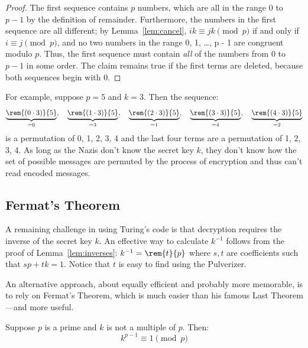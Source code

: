 \begin{proof}
The first sequence contains $p$ numbers, which are all in the range
$0$ to $p - 1$ by the definition of remainder.  Furthermore, the
numbers in the first sequence are all different; by
Lemma~\ref{lem:cancel}, $i k \equiv j k \pmod{p}$
if and only if $i \equiv j \pmod{p}$, and no two numbers in the range 0, 1,
\dots, p - 1 are congruent modulo $p$.  Thus, the first sequence must
contain \textit{all} of the numbers from 0 to $p - 1$ in some order.
The claim remains true if the first terms are deleted, because both
sequences begin with 0.
\end{proof}

For example, suppose $p = 5$ and $k = 3$.  Then the sequence:
%
\[
\underbrace{\rem{(0 \cdot 3)}{5}}_{=0},\quad
\underbrace{\rem{(1 \cdot 3)}{5}}_{=3},\quad
\underbrace{\rem{(2 \cdot 3)}{5}}_{=1},\quad
\underbrace{\rem{(3 \cdot 3)}{5}}_{=4},\quad
\underbrace{\rem{(4 \cdot 3)}{5}}_{=2}
\]
%
is a permutation of 0, 1, 2, 3, 4 and the last four terms are a
permutation of 1, 2, 3, 4.  As long as the Nazis don't know the secret key
$k$, they don't know how the set of possible messages are permuted by the
process of encryption and thus can't read encoded messages.


\subsection{Fermat's Theorem}

A remaining challenge in using Turing's code is that decryption requires
the inverse of the secret key $k$.  An effective way to calculate
$k^{-1}$ follows from the proof of Lemma~\ref{lem:inverses}: $k^{-1} =
\rem{t}{p}$ where $s,t$ are coefficients such that $sp+tk=1$.  Notice that
$t$ is easy to find using the Pulverizer.

An alternative approach, about equally efficient and probably more
memorable, is to rely on Fermat's Theorem, which is much easier than his
famous Last Theorem ---and more useful.

\begin{theorem}
Suppose $p$ is a prime and $k$ is not a multiple of $p$.  Then:
%
\[
k^{p-1} \equiv 1 \pmod{p}
\]
\end{theorem}


